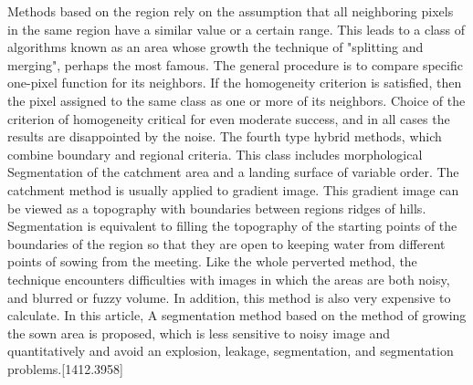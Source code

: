 \vspace{-0.5cm}
\noindent Methods based on the region rely on the assumption that all neighboring pixels in the same region have a similar value or a certain range. This leads to a class of algorithms known as an area whose growth the technique of "splitting and merging", perhaps the most famous. The general procedure is to compare specific one-pixel function for its neighbors. If the homogeneity criterion is satisfied, then the pixel assigned to the same class as one or more of its neighbors. Choice of the criterion of homogeneity critical for even moderate success, and in all cases the results are disappointed by the noise. The fourth type hybrid methods, which combine boundary and regional criteria. This class includes morphological Segmentation of the catchment area and a landing surface of variable order. The catchment method is usually applied to gradient image. This gradient image can be viewed as a topography with boundaries between regions ridges of hills. Segmentation is equivalent to filling the topography of the starting points of the boundaries of the region so that they are open to keeping water from different points of sowing from the meeting. Like the whole perverted method, the technique encounters difficulties with images in which the areas are both noisy, and blurred or fuzzy volume. In addition, this method is also very expensive to calculate. In this article, A segmentation method based on the method of growing the sown area is proposed, which is less sensitive to noisy image and quantitatively and avoid an explosion, leakage, segmentation, and segmentation problems.[1412.3958]
\vspace{-0.3cm}





